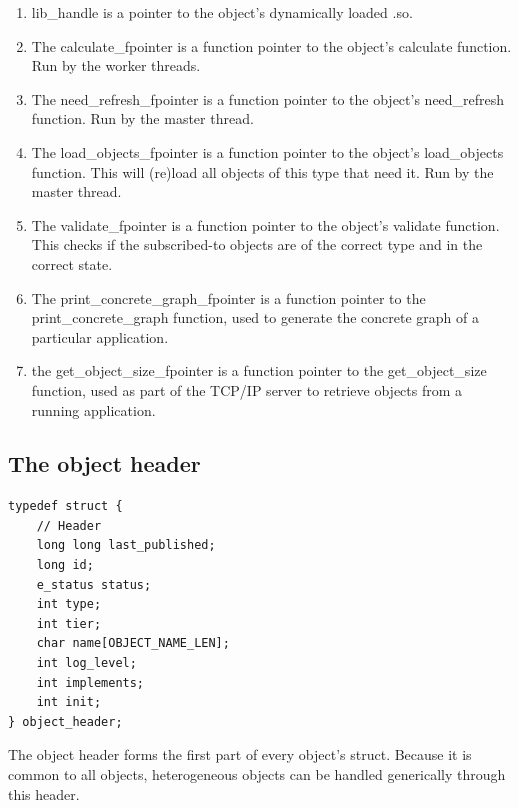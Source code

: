 \documentclass{report}
\begin{document}
\begin{enumerate}
\item lib_handle is a pointer to the object's dynamically loaded .so.
\item The calculate_fpointer is a function pointer to the object's calculate function. Run by the worker 
threads.
\item The need_refresh_fpointer is a function pointer to the object's need_refresh function. Run by the master thread.
\item The load_objects_fpointer is a function pointer to the object's load_objects function. This will (re)load all objects of this type that need it. Run by the master thread.
\item The validate_fpointer is a function pointer to the object's validate function. This checks if the subscribed-to objects are of the correct type and in the correct state.
\item The print_concrete_graph_fpointer is a function pointer to the print_concrete_graph function, used to generate the concrete graph of a particular application.
\item the get_object_size_fpointer is a function pointer to the get_object_size function, used as part of the TCP/IP server to retrieve objects from a running application.
\end{enumerate}

\subsection{The object header}

\begin{verbatim}
typedef struct {
    // Header
    long long last_published;
    long id;
    e_status status;
    int type;
    int tier;
    char name[OBJECT_NAME_LEN];
    int log_level;
    int implements;
    int init;
} object_header;
\end{verbatim}

The object header forms the first part of every object's struct. Because it is common to all objects, heterogeneous objects can be handled generically through this header.
\end{document}
